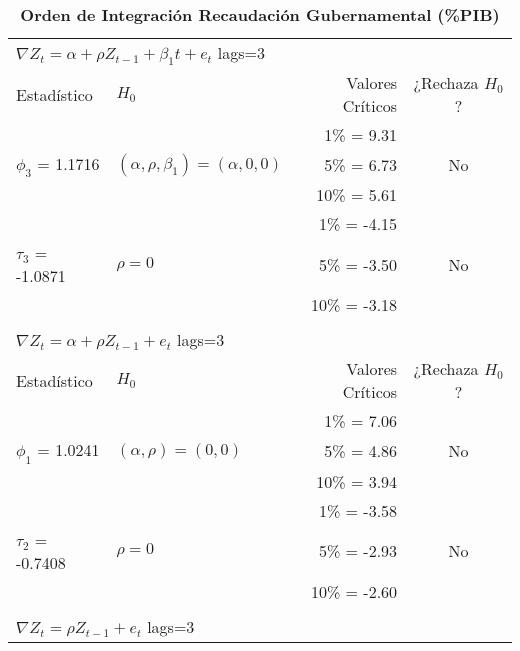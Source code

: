 \begin{table}[ht]
\caption{\textbf{Orden de Integración Recaudación Gubernamental (\%PIB)}}
\centering
	\begin{tabular}{llrc}
	\multicolumn{2}{l}{$\nabla Z_t = \alpha + \rho Z_{t-1} + \beta_1 t + e_t$ lags=3} \\
	\cline{1-2}
		Estadístico    			& $H_0$ 							& Valores Críticos 	& ¿Rechaza $H_0$? \\
		\hline
							&								& 1\%   = 9.31		&			\\
		 $\phi_3$ = 1.1716		& $(\alpha, \rho, \beta_1)=(\alpha,0,0)$     & 5\%   = 6.73		&       No		\\
							&  								& 10\% = 5.61		&       		\\
	\cline{1-4}				
							&								& 1\%   = -4.15		&			\\
		 $\tau_3$ = -1.0871		& $\rho=0$						& 5\%   = -3.50		&       No		\\
							&  								& 10\% = -3.18		&       		\\
	\firsthline
							&								&				&			\\
	\multicolumn{2}{l}{$\nabla Z_t = \alpha + \rho Z_{t-1} + e_t$ lags=3} \\
	\cline{1-2}
		Estadístico    			& $H_0$ 							& Valores Críticos 	& ¿Rechaza $H_0$? \\
		\hline
							&								& 1\%   = 7.06		&			\\
		 $\phi_1$ = 1.0241		& $(\alpha, \rho)=(0,0)$     			& 5\%   = 4.86		&       No		\\
							&  								& 10\% = 3.94		&       		\\
	\cline{1-4}				
							&								& 1\%   = -3.58		&			\\
		 $\tau_2$ = -0.7408		& $\rho=0$						& 5\%   = -2.93		&       No		\\
							&  								& 10\% = -2.60		&       		\\
	\firsthline
							&								&				&			\\
	\multicolumn{2}{l}{$\nabla Z_t = \rho Z_{t-1} + e_t$ lags=3} \\

\end{tabular}
\end{table}
